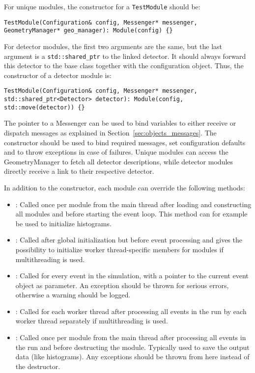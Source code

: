 For unique modules, the constructor for a \texttt{TestModule} should be:
\begin{verbatim}
TestModule(Configuration& config, Messenger* messenger, GeometryManager* geo_manager): Module(config) {}
\end{verbatim}

For detector modules, the first two arguments are the same, but the last argument is a \texttt{std::shared\_ptr} to the linked detector.
It should always forward this detector to the base class together with the configuration object.
Thus, the constructor of a detector module is:
\begin{verbatim}
TestModule(Configuration& config, Messenger* messenger, std::shared_ptr<Detector> detector): Module(config, std::move(detector)) {}
\end{verbatim}

The pointer to a Messenger can be used to bind variables to either receive or dispatch messages as explained in Section~\ref{sec:objects_messages}.
The constructor should be used to bind required messages, set configuration defaults and to throw exceptions in case of failures.
Unique modules can access the GeometryManager to fetch all detector descriptions, while detector modules directly receive a link to their respective detector.

In addition to the constructor, each module can override the following methods:
\begin{itemize}
\item {}: Called once per module from the main thread after loading and constructing all modules and before starting the event loop.
This method can for example be used to initialize histograms.
\item {}: Called after global initialization but before event processing and gives the possibility to initialize worker thread-specific members for modules if multithreading is used.
\item {}: Called for every event in the simulation, with a pointer to the current event object as parameter.
An exception should be thrown for serious errors, otherwise a warning should be logged.
\item {}: Called for each worker thread after processing all events in the run by each worker thread separately if multithreading is used.
\item {}: Called once per module from the main thread after processing all events in the run and before destructing the module.
Typically used to save the output data (like histograms).
Any exceptions should be thrown from here instead of the destructor.
\end{itemize}

